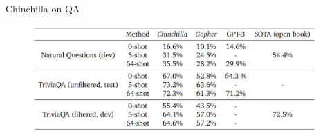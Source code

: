 
\begin{vbframe}{Chinchilla on QA}

\vfill

\begin{figure}
	\centering
	\includegraphics[width = 12cm]{./figure/chinchilla_qa.png} \\ 
\end{figure}

\vfill

\end{vbframe}


\endlecture
